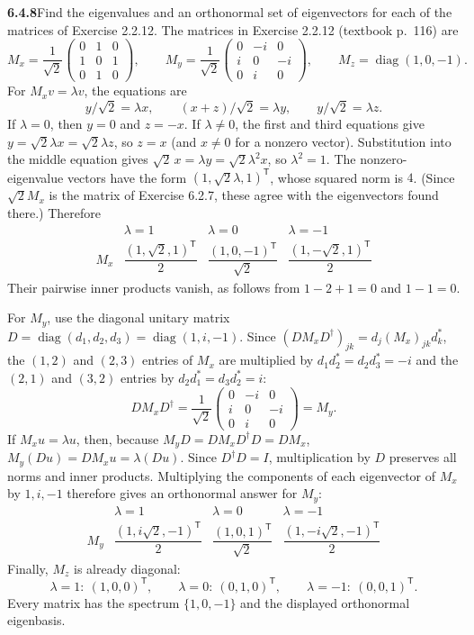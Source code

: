 \par\bigskip
\noindent\textbf{6.4.8}\quad Find the eigenvalues and an orthonormal set of
eigenvectors for each of the matrices of Exercise 2.2.12.
\solution
The matrices in Exercise 2.2.12 (textbook p.~116) are
\[
M_x=\frac1{\sqrt2}\begin{pmatrix}0&1&0\\1&0&1\\0&1&0\end{pmatrix},\qquad
M_y=\frac1{\sqrt2}\begin{pmatrix}0&-i&0\\i&0&-i\\0&i&0\end{pmatrix},
\qquad M_z=\operatorname{diag}(1,0,-1).
\]
For $M_xv=\lambda v$, the equations are
\[
y/\sqrt2=\lambda x,\qquad(x+z)/\sqrt2=\lambda y,
\qquad y/\sqrt2=\lambda z.
\]
If $\lambda=0$, then $y=0$ and $z=-x$. If $\lambda\ne0$, the first
and third equations give $y=\sqrt2\lambda x=\sqrt2\lambda z$, so $z=x$
(and $x\ne0$ for a nonzero vector). Substitution into the middle
equation gives $\sqrt2\,x=\lambda y=\sqrt2\lambda^2x$, so
$\lambda^2=1$. The nonzero-eigenvalue vectors have the form
$(1,\sqrt2\lambda,1)^{\mathsf T}$, whose squared norm is $4$.
(Since $\sqrt2M_x$ is the matrix of Exercise 6.2.7, these agree with
the eigenvectors found there.) Therefore
\[
\begin{array}{c|ccc}
&\lambda=1&\lambda=0&\lambda=-1\\\hline
M_x&\dfrac{(1,\sqrt2,1)^{\mathsf T}}2&
\dfrac{(1,0,-1)^{\mathsf T}}{\sqrt2}&
\dfrac{(1,-\sqrt2,1)^{\mathsf T}}2
\end{array}
\]
Their pairwise inner products vanish, as follows from $1-2+1=0$
and $1-1=0$.

For $M_y$, use the diagonal unitary matrix
$D=\operatorname{diag}(d_1,d_2,d_3)=\operatorname{diag}(1,i,-1)$.
Since $(DM_xD^\dagger)_{jk}=d_j(M_x)_{jk}d_k^*$, the $(1,2)$ and
$(2,3)$ entries of $M_x$ are multiplied by $d_1d_2^*=d_2d_3^*=-i$ and
the $(2,1)$ and $(3,2)$ entries by $d_2d_1^*=d_3d_2^*=i$:
\[
DM_xD^\dagger
=\frac1{\sqrt2}\begin{pmatrix}0&-i&0\\i&0&-i\\0&i&0\end{pmatrix}=M_y.
\]
If $M_xu=\lambda u$, then, because $M_yD=DM_xD^\dagger D=DM_x$,
$M_y(Du)=DM_xu=\lambda(Du)$. Since $D^\dagger D=I$, multiplication
by $D$ preserves all norms and inner products. Multiplying the
components of each eigenvector of $M_x$ by $1,i,-1$ therefore gives an
orthonormal answer for $M_y$:
\[
\begin{array}{c|ccc}
&\lambda=1&\lambda=0&\lambda=-1\\\hline
M_y&\dfrac{(1,i\sqrt2,-1)^{\mathsf T}}2&
\dfrac{(1,0,1)^{\mathsf T}}{\sqrt2}&
\dfrac{(1,-i\sqrt2,-1)^{\mathsf T}}2
\end{array}
\]
Finally, $M_z$ is already diagonal:
\[
\boxed{\lambda=1:\ (1,0,0)^{\mathsf T},\qquad
\lambda=0:\ (0,1,0)^{\mathsf T},\qquad
\lambda=-1:\ (0,0,1)^{\mathsf T}.}
\]
Every matrix has the spectrum $\{1,0,-1\}$ and the displayed
orthonormal eigenbasis.

